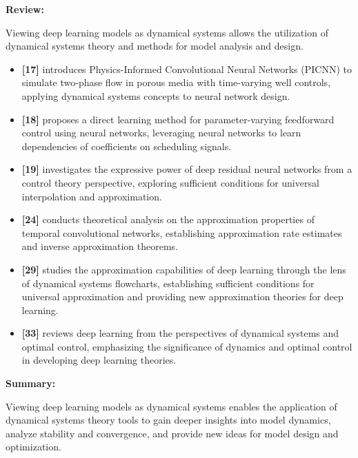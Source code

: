 \documentclass{article}
\theoremstyle{plain}
\theoremstyle{definition}
\theoremstyle{remark}
\begin{document}
\textbf{Review:}

Viewing deep learning models as dynamical systems allows the utilization of dynamical systems theory and methods for model analysis and design.

\begin{itemize}
    \item \textbf{[17]} introduces Physics-Informed Convolutional Neural Networks (PICNN) to simulate two-phase flow in porous media with time-varying well controls, applying dynamical systems concepts to neural network design.
    
    \item \textbf{[18]} proposes a direct learning method for parameter-varying feedforward control using neural networks, leveraging neural networks to learn dependencies of coefficients on scheduling signals.
    
    \item \textbf{[19]} investigates the expressive power of deep residual neural networks from a control theory perspective, exploring sufficient conditions for universal interpolation and approximation.
    
    \item \textbf{[24]} conducts theoretical analysis on the approximation properties of temporal convolutional networks, establishing approximation rate estimates and inverse approximation theorems.
    
    \item \textbf{[29]} studies the approximation capabilities of deep learning through the lens of dynamical systems flowcharts, establishing sufficient conditions for universal approximation and providing new approximation theories for deep learning.
    
    \item \textbf{[33]} reviews deep learning from the perspectives of dynamical systems and optimal control, emphasizing the significance of dynamics and optimal control in developing deep learning theories.
\end{itemize}

\textbf{Summary:}

Viewing deep learning models as dynamical systems enables the application of dynamical systems theory tools to gain deeper insights into model dynamics, analyze stability and convergence, and provide new ideas for model design and optimization.
\end{document}
